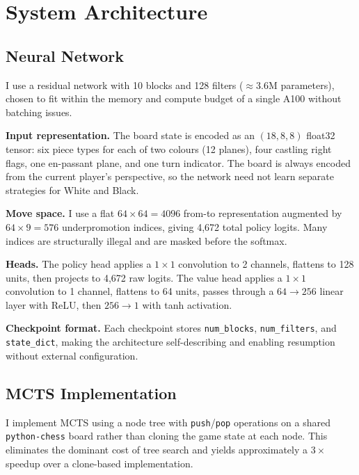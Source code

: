 \documentclass[conference]{IEEEtran}
\begin{document}
\section{System Architecture}

\subsection{Neural Network}

I use a residual network with 10 blocks and 128 filters ($\approx$3.6M
parameters), chosen to fit within the memory and compute budget of a single
A100 without batching issues.

\textbf{Input representation.} The board state is encoded as an
$(18, 8, 8)$ float32 tensor: six piece types for each of two colours (12
planes), four castling right flags, one en-passant plane, and one turn
indicator. The board is always encoded from the current player's perspective,
so the network need not learn separate strategies for White and Black.

\textbf{Move space.} I use a flat $64 \times 64 = 4096$ from-to
representation augmented by $64 \times 9 = 576$ underpromotion indices, giving
4,672 total policy logits. Many indices are structurally illegal and are masked
before the softmax.

\textbf{Heads.} The policy head applies a $1{\times}1$ convolution to 2
channels, flattens to 128 units, then projects to 4,672 raw logits. The value
head applies a $1{\times}1$ convolution to 1 channel, flattens to 64 units,
passes through a $64 \to 256$ linear layer with ReLU, then $256 \to 1$ with
tanh activation.

\textbf{Checkpoint format.} Each checkpoint stores \texttt{num\_blocks},
\texttt{num\_filters}, and \texttt{state\_dict}, making the architecture
self-describing and enabling resumption without external configuration.

\subsection{MCTS Implementation}

I implement MCTS using a node tree with \texttt{push}/\texttt{pop} operations
on a shared \texttt{python-chess} board rather than cloning the game state at
each node. This eliminates the dominant cost of tree search and yields
approximately a $3\times$ speedup over a clone-based implementation.
\end{document}
